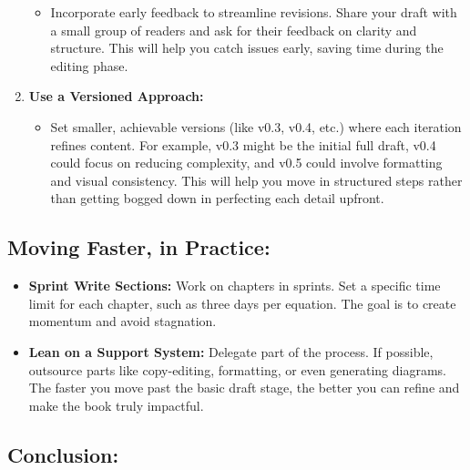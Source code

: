 \documentclass[
  12 pt,
  a4paper,
]{book}
\providecommand{\tightlist}{%
  \setlength{\itemsep}{0pt}\setlength{\parskip}{0pt}}
\numberwithin{equation}{section}
\theoremstyle{plain}      %
\theoremstyle{definition} %
\theoremstyle{remark}     %
\theoremstyle{note}         %
\begin{document}
\begin{enumerate}
  \begin{itemize}
  \tightlist
  \item
    Incorporate early feedback to streamline revisions. Share your draft
    with a small group of readers and ask for their feedback on clarity
    and structure. This will help you catch issues early, saving time
    during the editing phase.
  \end{itemize}
\item
  \textbf{Use a Versioned Approach:}

  \begin{itemize}
  \tightlist
  \item
    Set smaller, achievable versions (like v0.3, v0.4, etc.) where each
    iteration refines content. For example, v0.3 might be the initial
    full draft, v0.4 could focus on reducing complexity, and v0.5 could
    involve formatting and visual consistency. This will help you move
    in structured steps rather than getting bogged down in perfecting
    each detail upfront.
  \end{itemize}
\end{enumerate}

\hypertarget{moving-faster-in-practice}{%
\subsection*{Moving Faster, in
Practice:}\label{moving-faster-in-practice}}

\begin{itemize}
\tightlist
\item
  \textbf{Sprint Write Sections:} Work on chapters in sprints. Set a
  specific time limit for each chapter, such as three days per equation.
  The goal is to create momentum and avoid stagnation.
\item
  \textbf{Lean on a Support System:} Delegate part of the process. If
  possible, outsource parts like copy-editing, formatting, or even
  generating diagrams. The faster you move past the basic draft stage,
  the better you can refine and make the book truly impactful.
\end{itemize}

\hypertarget{conclusion}{%
\subsection*{Conclusion:}\label{conclusion}}
\end{document}
